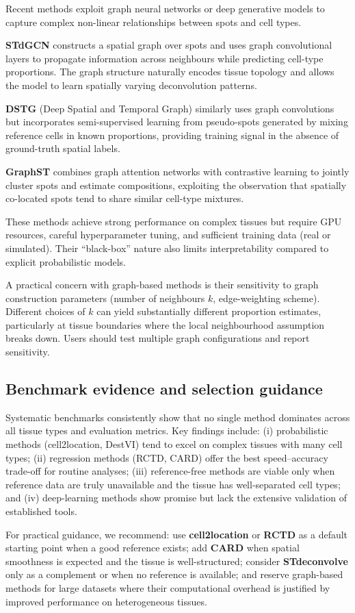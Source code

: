 Recent methods exploit graph neural networks or deep generative models to capture complex non-linear relationships between spots and cell types.

\textbf{STdGCN} constructs a spatial graph over spots and uses graph convolutional layers to propagate information across neighbours while predicting cell-type proportions. The graph structure naturally encodes tissue topology and allows the model to learn spatially varying deconvolution patterns.

\textbf{DSTG} (Deep Spatial and Temporal Graph) \citep{song2021stdgcn} similarly uses graph convolutions but incorporates semi-supervised learning from pseudo-spots generated by mixing reference cells in known proportions, providing training signal in the absence of ground-truth spatial labels.

\textbf{GraphST} \citep{long2023spatially} combines graph attention networks with contrastive learning to jointly cluster spots and estimate compositions, exploiting the observation that spatially co-located spots tend to share similar cell-type mixtures.

These methods achieve strong performance on complex tissues but require GPU resources, careful hyperparameter tuning, and sufficient training data (real or simulated). Their ``black-box'' nature also limits interpretability compared to explicit probabilistic models.

A practical concern with graph-based methods is their sensitivity to graph construction parameters (number of neighbours $k$, edge-weighting scheme). Different choices of $k$ can yield substantially different proportion estimates, particularly at tissue boundaries where the local neighbourhood assumption breaks down. Users should test multiple graph configurations and report sensitivity.

\subsection{Benchmark evidence and selection guidance}

Systematic benchmarks \citep{li2023benchmarking,yan2024benchmarking} consistently show that no single method dominates across all tissue types and evaluation metrics. Key findings include: (i) probabilistic methods (cell2location, DestVI) tend to excel on complex tissues with many cell types; (ii) regression methods (RCTD, CARD) offer the best speed--accuracy trade-off for routine analyses; (iii) reference-free methods are viable only when reference data are truly unavailable and the tissue has well-separated cell types; and (iv) deep-learning methods show promise but lack the extensive validation of established tools.

For practical guidance, we recommend: use \textbf{cell2location} or \textbf{RCTD} as a default starting point when a good reference exists; add \textbf{CARD} when spatial smoothness is expected and the tissue is well-structured; consider \textbf{STdeconvolve} only as a complement or when no reference is available; and reserve graph-based methods for large datasets where their computational overhead is justified by improved performance on heterogeneous tissues.
